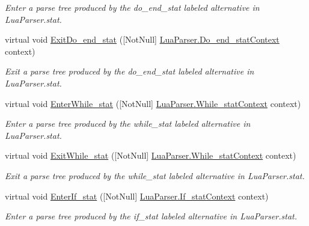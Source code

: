 \begin{DoxyCompactItemize}
\begin{DoxyCompactList}\small\item\em Enter a parse tree produced by the {\ttfamily do\+\_\+end\+\_\+stat} labeled alternative in Lua\+Parser.\+stat. \end{DoxyCompactList}\item 
virtual void \mbox{\hyperlink{classzlua_1_1_lua_base_listener_acc7bef5cd55b204e258816f477397304}{Exit\+Do\+\_\+end\+\_\+stat}} (\mbox{[}Not\+Null\mbox{]} \mbox{\hyperlink{classzlua_1_1_lua_parser_1_1_do__end__stat_context}{Lua\+Parser.\+Do\+\_\+end\+\_\+stat\+Context}} context)
\begin{DoxyCompactList}\small\item\em Exit a parse tree produced by the {\ttfamily do\+\_\+end\+\_\+stat} labeled alternative in Lua\+Parser.\+stat. \end{DoxyCompactList}\item 
virtual void \mbox{\hyperlink{classzlua_1_1_lua_base_listener_a9b8d8a799001a9167716f892e540ba76}{Enter\+While\+\_\+stat}} (\mbox{[}Not\+Null\mbox{]} \mbox{\hyperlink{classzlua_1_1_lua_parser_1_1_while__stat_context}{Lua\+Parser.\+While\+\_\+stat\+Context}} context)
\begin{DoxyCompactList}\small\item\em Enter a parse tree produced by the {\ttfamily while\+\_\+stat} labeled alternative in Lua\+Parser.\+stat. \end{DoxyCompactList}\item 
virtual void \mbox{\hyperlink{classzlua_1_1_lua_base_listener_a35e673f6a18bfef7e92e04ef244093fc}{Exit\+While\+\_\+stat}} (\mbox{[}Not\+Null\mbox{]} \mbox{\hyperlink{classzlua_1_1_lua_parser_1_1_while__stat_context}{Lua\+Parser.\+While\+\_\+stat\+Context}} context)
\begin{DoxyCompactList}\small\item\em Exit a parse tree produced by the {\ttfamily while\+\_\+stat} labeled alternative in Lua\+Parser.\+stat. \end{DoxyCompactList}\item 
virtual void \mbox{\hyperlink{classzlua_1_1_lua_base_listener_a6c6b8d7541116a14fcaf314180435d4b}{Enter\+If\+\_\+stat}} (\mbox{[}Not\+Null\mbox{]} \mbox{\hyperlink{classzlua_1_1_lua_parser_1_1_if__stat_context}{Lua\+Parser.\+If\+\_\+stat\+Context}} context)
\begin{DoxyCompactList}\small\item\em Enter a parse tree produced by the {\ttfamily if\+\_\+stat} labeled alternative in Lua\+Parser.\+stat. \end{DoxyCompactList}\item 

\end{DoxyCompactItemize}
